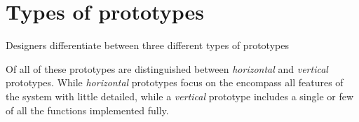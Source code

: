 \section{Types of prototypes} \label{sec:types_of_prototypes}
Designers differentiate between three different types of prototypes





Of all of these prototypes are distinguished between \emph{horizontal} and \emph{vertical} prototypes. While \emph{horizontal} prototypes focus on the encompass all features of the system with little detailed, while a \emph{vertical} prototype includes a single or few of all the functions implemented fully. \cite[p. 179]{benyon_14}
 

